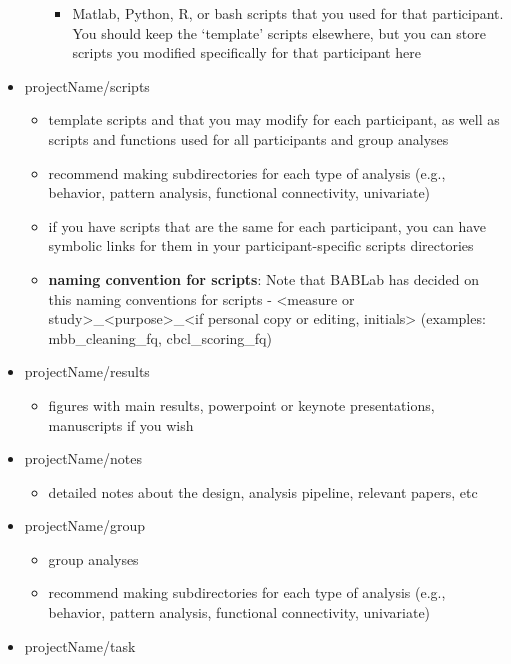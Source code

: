 \documentclass[
]{book}
\providecommand{\tightlist}{%
  \setlength{\itemsep}{0pt}\setlength{\parskip}{0pt}}
\begin{document}
\begin{itemize}
\begin{itemize}
    \begin{itemize}
    \tightlist
    \item
      Matlab, Python, R, or bash scripts that you used for that participant. You should keep the `template' scripts elsewhere, but you can store scripts you modified specifically for that participant here
    \end{itemize}
  \end{itemize}
\item
  projectName/scripts

  \begin{itemize}
  \tightlist
  \item
    template scripts and that you may modify for each participant, as well as scripts and functions used for all participants and group analyses
  \item
    recommend making subdirectories for each type of analysis (e.g., behavior, pattern analysis, functional connectivity, univariate)
  \item
    if you have scripts that are the same for each participant, you can have symbolic links for them in your participant-specific scripts directories
  \item
    \textbf{naming convention for scripts}: Note that BABLab has decided on this naming conventions for scripts - \textless measure or study\textgreater\_\textless purpose\textgreater\_\textless if personal copy or editing, initials\textgreater{} (examples: mbb\_cleaning\_fq, cbcl\_scoring\_fq)
  \end{itemize}
\item
  projectName/results

  \begin{itemize}
  \tightlist
  \item
    figures with main results, powerpoint or keynote presentations, manuscripts if you wish
  \end{itemize}
\item
  projectName/notes

  \begin{itemize}
  \tightlist
  \item
    detailed notes about the design, analysis pipeline, relevant papers, etc
  \end{itemize}
\item
  projectName/group

  \begin{itemize}
  \tightlist
  \item
    group analyses
  \item
    recommend making subdirectories for each type of analysis (e.g., behavior, pattern analysis, functional connectivity, univariate)
  \end{itemize}
\item
  projectName/task


\end{itemize}
\end{document}
